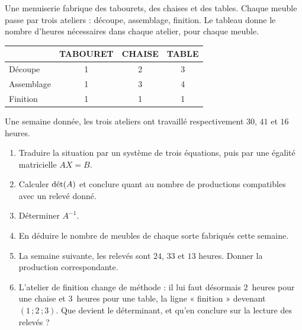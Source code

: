 \begin{jecherche}
Une menuiserie fabrique des tabourets, des chaises et des tables. Chaque
meuble passe par trois ateliers : découpe, assemblage, finition. Le tableau
donne le nombre d'heures nécessaires dans chaque atelier, pour chaque meuble.

\begin{center}
\setlength{\tabcolsep}{9pt}
\renewcommand{\arraystretch}{1.2}
\begin{tabular}{@{}lccc@{}}
\toprule
& \textsf{\footnotesize\bfseries TABOURET} & \textsf{\footnotesize\bfseries CHAISE}
& \textsf{\footnotesize\bfseries TABLE} \\
\midrule
Découpe    & 1 & 2 & 3 \\
Assemblage & 1 & 3 & 4 \\
Finition   & 1 & 1 & 1 \\
\bottomrule
\end{tabular}
\end{center}

Une semaine donnée, les trois ateliers ont travaillé respectivement $30$,
$41$ et $16$ heures.

\begin{enumerate}[label=\textbf{\arabic*.}, leftmargin=*, itemsep=0.3em]
  \item Traduire la situation par un système de trois équations, puis par une
        égalité matricielle $AX = B$.
  \item Calculer $\operatorname{d\acute{e}t}(A)$ et conclure quant au nombre de productions
        compatibles avec un relevé donné.
  \item Déterminer $A^{-1}$.
  \item En déduire le nombre de meubles de chaque sorte fabriqués cette
        semaine.
  \item La semaine suivante, les relevés sont $24$, $33$ et $13$ heures.
        Donner la production correspondante.
  \item L'atelier de finition change de méthode : il lui faut désormais
        $2$~heures pour une chaise et $3$~heures pour une table, la ligne
        « finition » devenant $(1\,;2\,;3)$. Que devient le déterminant, et
        qu'en conclure sur la lecture des relevés ?
\end{enumerate}
\end{jecherche}

